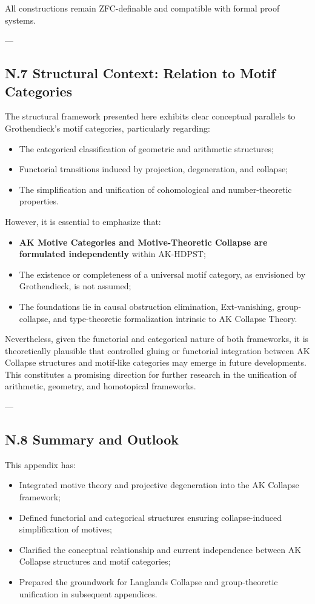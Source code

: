 \documentclass[11pt]{article}
\begin{document}
All constructions remain ZFC-definable and compatible with formal proof systems.

---

\subsection*{N.7 Structural Context: Relation to Motif Categories}

The structural framework presented here exhibits clear conceptual parallels to Grothendieck's motif categories, particularly regarding:

\begin{itemize}
  \item The categorical classification of geometric and arithmetic structures;
  \item Functorial transitions induced by projection, degeneration, and collapse;
  \item The simplification and unification of cohomological and number-theoretic properties.
\end{itemize}

However, it is essential to emphasize that:

\begin{itemize}
  \item \textbf{AK Motive Categories and Motive-Theoretic Collapse are formulated independently} within AK-HDPST;
  \item The existence or completeness of a universal motif category, as envisioned by Grothendieck, is not assumed;
  \item The foundations lie in causal obstruction elimination, Ext-vanishing, group-collapse, and type-theoretic formalization intrinsic to AK Collapse Theory.
\end{itemize}

Nevertheless, given the functorial and categorical nature of both frameworks, it is theoretically plausible that controlled gluing or functorial integration between AK Collapse structures and motif-like categories may emerge in future developments. This constitutes a promising direction for further research in the unification of arithmetic, geometry, and homotopical frameworks.

---

\subsection*{N.8 Summary and Outlook}

This appendix has:
\begin{itemize}
  \item Integrated motive theory and projective degeneration into the AK Collapse framework;
  \item Defined functorial and categorical structures ensuring collapse-induced simplification of motives;
  \item Clarified the conceptual relationship and current independence between AK Collapse structures and motif categories;
  \item Prepared the groundwork for Langlands Collapse and group-theoretic unification in subsequent appendices.
\end{itemize}
\end{document}
